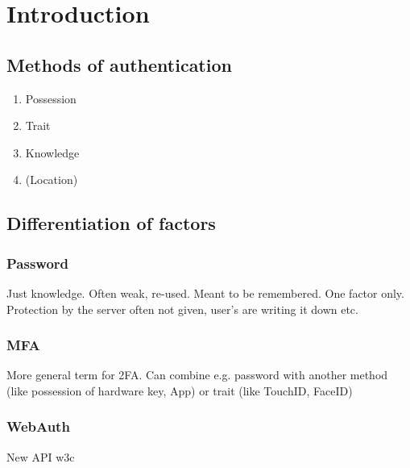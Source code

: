 \chapter{Introduction}

\blindtext

\section{Methods of authentication}

\begin{enumerate}
	\item Possession
	\item Trait
	\item Knowledge
	\item (Location)
\end{enumerate}

\section{Differentiation of factors}

\subsection{Password}

Just knowledge. Often weak, re-used. Meant to be remembered. One factor only.\\
Protection by the server often not given, user's are writing it down etc.

\subsection{MFA}

More general term for 2FA. Can combine e.g. password with another method (like possession of hardware key, App) or trait (like TouchID, FaceID)

\subsection{WebAuth}

New API \gls{w3c}